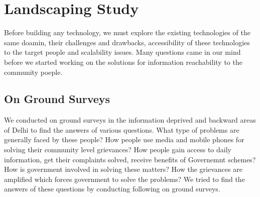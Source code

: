 \chapter{Landscaping Study}

Before building any technology, we must explore the existing technologies of the same doamin, their challenges and drawbacks, accessibility of these technologies to the target people and scalability issues. Many questions came in our mind before we started working on the solutions for information reachability to the community poeple.

\section {On Ground Surveys}
We conducted on ground surveys in the information deprived and backward areas of Delhi to find the answers of various questions. What type of problems are generally faced by these people? How people use media and mobile phones for solving their community level grievances? How people gain access to daily information, get their complaints solved, receive benefits of Governemnt schemes? How is government involved in solving these matters? How the grievances are amplified which forces government to solve the problems? We tried to find the answers of these questions by conducting following on ground surveys.


